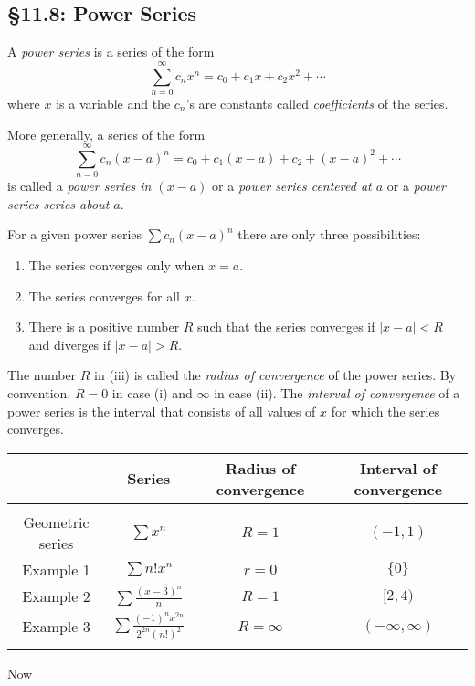 \subsection*{\S 11.8: Power Series}
\begin{definition}
A \emph{power series} is a series of the form
\[
\sum_{n=0}^\infty c_nx^n=c_0+c_1x+c_2x^2+\dotsb
\]
where $x$ is a variable and the $c_n$'s are constants called
\emph{coefficients} of the series.
\end{definition}
\begin{definition}
More generally, a series of the form
\[
\sum_{n=0}^\infty c_n(x-a)^n=c_0+c_1(x-a)+c_2+(x-a)^2+\dotsb
\]
is called a \emph{power series in $(x-a)$} or a \emph{power series centered
at $a$} or a \emph{power series series about $a$}.
\end{definition}
\begin{theorem}
For a given power series $\sum c_n(x-a)^n$ there are only three
possibilities:
\begin{enumerate}[label=\textnormal{(\roman*)},noitemsep]
\item The series converges only when $x=a$.
\item The series converges for all $x$.
\item There is a positive number $R$ such that the series converges if
  $|x-a|<R$ and diverges if $|x-a|>R$.
\end{enumerate}
\end{theorem}
The number $R$ in (iii) is called the \emph{radius of convergence} of the
power series. By convention, $R=0$ in case (i) and $\infty$ in case (ii).
The \emph{interval of convergence} of a power series is the interval that
consists of all values of $x$ for which the series converges.
\begin{center}
\begin{tabular}{|c|c|c|c|}
\hline
&Series&Radius of convergence&Interval of convergence\\
\hline
&&&\\
Geometric series&$\displaystyle\sum x^n$&$R=1$&$(-1,1)$\\
Example 1&$\displaystyle\sum n!x^n$&$r=0$&$\{0\}$\\
Example 2&$\displaystyle\sum\frac{(x-3)^n}{n}$&$R=1$&$[2,4)$\\
Example
  3&$\displaystyle\sum\frac{(-1)^nx^{2n}}{2^{2n}(n!)^2}$&$R=\infty$&$(-\infty,\infty)$\\
&&&\\
\hline
\end{tabular}
\end{center}
Now
\newpage
